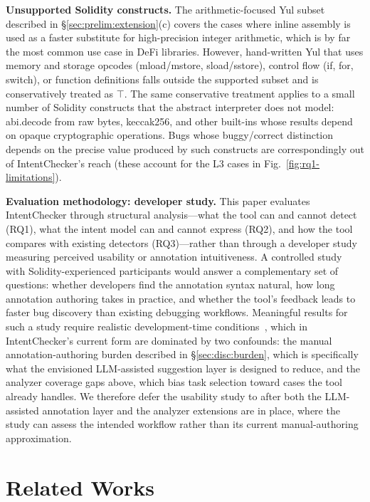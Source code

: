 \documentclass[pdflatex,sn-basic]{sn-jnl}%
\theoremstyle{thmstyleone}%
\theoremstyle{thmstyletwo}%
\theoremstyle{thmstylethree}%
\begin{document}
\smallskip
\noindent\textbf{Unsupported Solidity constructs.}
The arithmetic-focused Yul subset described in §\ref{sec:prelim:extension}(c) covers the cases where inline assembly is used as a faster substitute for high-precision integer arithmetic, which is by far the most common use case in DeFi libraries.
However, hand-written Yul that uses memory and storage opcodes (mload/mstore, sload/sstore), control flow (if, for, switch), or function definitions falls outside the supported subset and is conservatively treated as $\top$.
The same conservative treatment applies to a small number of Solidity constructs that the abstract interpreter does not model: abi.decode from raw bytes, keccak256, and other built-ins whose results depend on opaque cryptographic operations.
Bugs whose buggy/correct distinction depends on the precise value produced by such constructs are correspondingly out of IntentChecker's reach (these account for the L3 cases in Fig.~\ref{fig:rq1-limitations}).

\smallskip
\noindent\textbf{Evaluation methodology: developer study.}
This paper evaluates IntentChecker through structural analysis---what the tool can and cannot detect (RQ1), what the intent model can and cannot express (RQ2), and how the tool compares with existing detectors (RQ3)---rather than through a developer study measuring perceived usability or annotation intuitiveness.
A controlled study with Solidity-experienced participants would answer a complementary set of questions: whether developers find the annotation syntax natural, how long annotation authoring takes in practice, and whether the tool's feedback leads to faster bug discovery than existing debugging workflows.
Meaningful results for such a study require realistic development-time conditions~\citep{defisecurity}, which in IntentChecker's current form are dominated by two confounds: the manual annotation-authoring burden described in §\ref{sec:disc:burden}, which is specifically what the envisioned LLM-assisted suggestion layer is designed to reduce, and the analyzer coverage gaps above, which bias task selection toward cases the tool already handles.
We therefore defer the usability study to after both the LLM-assisted annotation layer and the analyzer extensions are in place, where the study can assess the intended workflow rather than its current manual-authoring approximation.

\section{Related Works}\label{sec:related}
\end{document}
